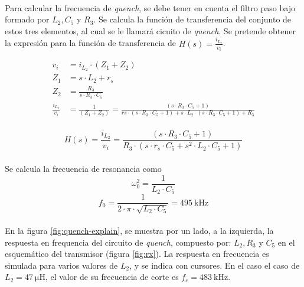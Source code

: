 \paragraph{}
Para calcular la frecuencia de \textit{quench}, se debe tener en cuenta el filtro paso bajo formado por $L_2, C_5$ y $R_3$. 
Se calcula la función de transferencia del conjunto de estos tres elementos, al cual se le llamará cicuito de \textit{quench}.
Se pretende obtener la expresión para la función de transferencia de $H(s) = \frac{i_{L_2}}{v_i}$. 

\begin{align*} 
   v_i &= i_{L_2} \cdot ( Z_1 + Z_2 ) \\
   Z_1 &= s\cdot L_2 + r_s \\
   Z_2 &= \frac{R_3}{s \cdot R_3 \cdot C_5} \\
   \frac{i_{L_2}}{v_i} &= \frac{1}{( Z_1 + Z_2 )} = \frac{(s\cdot R_3 \cdot C_5 + 1)}{rs \cdot (s\cdot R_3 \cdot C_5 + 1) + s \cdot L_2 \cdot(s\cdot R_3 \cdot C_5 + 1) + R_3 } \\
\end{align*}

\begin{equation}
   \label{eq:Al_tx}
   H(s) = \frac{i_{L_2}}{v_i} = \frac{(s\cdot R_3 \cdot C_5 + 1)}{R_3 \cdot ( s\cdot r_s \cdot C_5 + s^2 \cdot L_2 \cdot C_5 + 1)}
\end{equation}
\paragraph{}
Se calcula la frecuencia de resonancia como $$\omega_0^2 = \frac{1}{L_2 \cdot C_5}$$
$$ f_0 = \frac{1}{2 \cdot \pi \cdot \sqrt{L_2 \cdot C_5}} = \SI{495}{\kilo\hertz} $$
\paragraph{}
En la figura \ref{fig:quench-explain}, se muestra por un lado, a la izquierda, la respuesta en frequencia del circuito de \textit{quench}, compuesto por: $L_2, R_3$ y $C_5$ en el esquemático del transmisor (figura \ref{fig:rx}). La respuesta en frecuencia es simulada para varios valores de $L_2$, y se indica con cursores. En el caso el caso de $L_2 = \SI{47}{\micro\henry}$, el valor de su frecuencia de corte es $f_c = \SI{483}{\kilo\hertz}$. 
